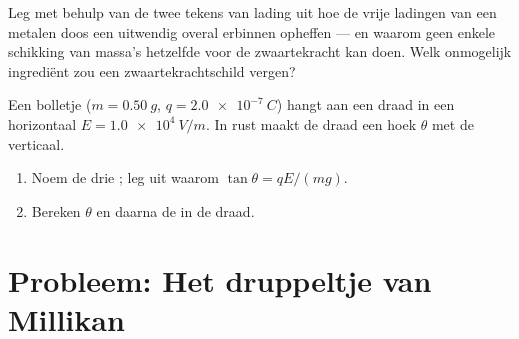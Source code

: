 \begin{exercise}[$\star\star\star$]\label{exo:g11:electric-gravitational-fields:14}
Leg met behulp van de twee tekens van lading uit hoe de vrije ladingen
van een metalen doos een uitwendig  overal erbinnen
opheffen --- en waarom geen enkele schikking van massa's hetzelfde voor
de zwaartekracht kan doen. Welk onmogelijk ingrediënt zou een
zwaartekrachtschild vergen?
\end{exercise}

\begin{exercise}[$\star\star\star$]\label{exo:g11:electric-gravitational-fields:15}
Een bolletje ($m = \qty{0.50}{g}$, $q = \qty{+2.0e-7}{C}$) hangt aan een
draad in een horizontaal  $E = \qty{1.0e4}{V/m}$. In rust
maakt de draad een hoek $\theta$ met de verticaal.
\begin{enumerate}
  \item Noem de drie ; leg uit waarom $\tan\theta = qE / (mg)$.
  \item Bereken $\theta$ en daarna de  in de draad.
\end{enumerate}
\end{exercise}

\section{Probleem: Het druppeltje van Millikan}

